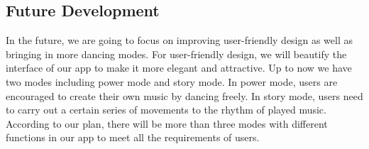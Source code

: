 \documentclass{article}
\begin{document}
\subsection{Future Development}
\hspace*{2em}In the future, we are going to focus on improving user-friendly design as well as bringing in more dancing modes. For user-friendly design, we will beautify the interface of our app to make it more elegant and attractive. Up to now we have two modes including power mode and story mode. In power mode, users are encouraged to create their own music by dancing freely. In story mode, users need to carry out a certain series of movements to the rhythm of played music. According to our plan, there will be more than three modes with different functions in our app to meet all the requirements of users.
\end{document}
